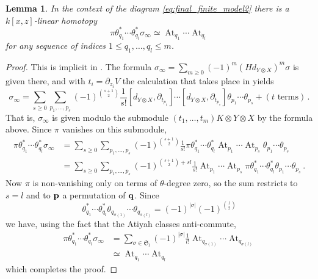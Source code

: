\documentclass[english,letter paper,12pt,leqno]{article}
\newtheorem{lemma}[theorem]{Lemma}
\theoremstyle{example}
\numberwithin{equation}{section}
\DeclareMathOperator{\At}{At}
\begin{document}
\begin{lemma}\label{lemma:transfercreations} In the context of the diagram \eqref{eq:final_finite_model2} there is a $k[x,z]$-linear homotopy
\[
\pi \theta_{q_1}^* \cdots \theta_{q_l}^* \sigma_\infty \simeq \At_{q_1} \cdots \At_{q_l}
\]
for any sequence of indices $1 \le q_1,\ldots,q_l \le m$.
\end{lemma}
\begin{proof}
This is implicit in \cite[Section 10]{dm1102.2957}. The formula $\sigma_\infty = \sum_{m \ge 0} (-1)^m(H d_{Y \otimes X})^m \sigma$ is given there, and with $t_i = \partial_{z_i} V$ the calculation that takes place in \cite[(10.3)]{dm1102.2957} yields
\begin{equation}\label{eq:atiyah_formula_sigma}
\sigma_\infty = \sum_{s \ge 0} \sum_{p_1,\ldots,p_s} (-1)^{\binom{s+1}{2}} \frac{1}{s!} [ d_{Y \otimes X}, \partial_{t_{p_1}}] \cdots [ d_{Y \otimes X}, \partial_{t_{p_s}}] \theta_{p_1} \cdots \theta_{p_s} + (t \text{ terms})\,.
\end{equation}
That is, $\sigma_\infty$ is given modulo the submodule $(t_1,\ldots,t_m) K \otimes Y \otimes X$ by the formula above. Since $\pi$ vanishes on this submodule,
\begin{align*}
\pi \theta_{q_1}^* \cdots \theta_{q_l}^* \sigma_\infty &= \sum_{s \ge 0} \sum_{p_1,\ldots,p_s} (-1)^{\binom{s+1}{2}} \frac{1}{s!} \pi \theta_{q_1}^* \cdots \theta_{q_l}^* \At_{p_1} \cdots \At_{p_s} \theta_{p_1} \cdots \theta_{p_s}\\
&= \sum_{s \ge 0} \sum_{p_1,\ldots,p_s} (-1)^{\binom{s+1}{2} + sl} \frac{1}{s!} \At_{p_1} \cdots \At_{p_s} \pi \theta_{q_1}^* \cdots \theta_{q_l}^* \theta_{p_1} \cdots \theta_{p_s}\,.
\end{align*}
Now $\pi$ is non-vanishing only on terms of $\theta$-degree zero, so the sum restricts to $s = l$ and to $\bold{p}$ a permutation of $\bold{q}$. Since
\[
\theta_{q_1}^* \cdots \theta_{q_l}^* \theta_{q_{\sigma(1)}} \cdots \theta_{q_{\sigma(l)}} = (-1)^{|\sigma|} (-1)^{\binom{l}{2}}
\]
we have, using the fact that the Atiyah classes anti-commute,
\begin{align*}
\pi \theta_{q_1}^* \cdots \theta_{q_l}^* \sigma_\infty &= \sum_{\sigma \in \mathfrak{S}_l} (-1)^{|\sigma|} \frac{1}{l!} \At_{q_{\sigma(1)}} \cdots \At_{q_{\sigma(l)}}\\
&\simeq \At_{q_1} \cdots \At_{q_l}
\end{align*}
which completes the proof.
\end{proof}
\end{document}
